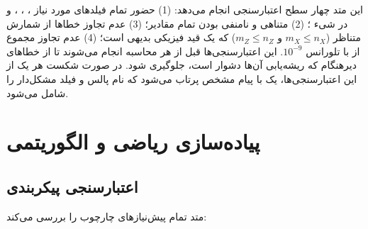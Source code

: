 این متد چهار سطح اعتبارسنجی انجام می‌دهد: (1) حضور تمام فیلدهای مورد نیاز ، ، ،  و  در شیء ؛ (2) متناهی و نامنفی بودن تمام مقادیر؛ (3) عدم تجاوز خطاها از شمارش متناظر ($m_X \le n_X$ و $m_Z \le n_Z$) که یک قید فیزیکی بدیهی است؛ (4) عدم تجاوز مجموع  از  با تلورانس $10^{-9}$. این اعتبارسنجی‌ها قبل از هر محاسبه انجام می‌شوند تا از خطاهای دیرهنگام که ریشه‌یابی آن‌ها دشوار است، جلوگیری شود. در صورت شکست هر یک از این اعتبارسنجی‌ها، یک  با پیام مشخص پرتاب می‌شود که نام پالس و فیلد مشکل‌دار را شامل می‌شود.

\section{پیاده‌سازی ریاضی و الگوریتمی}

\subsection{اعتبارسنجی پیکربندی}

متد  تمام پیش‌نیازهای چارچوب  را بررسی می‌کند:

